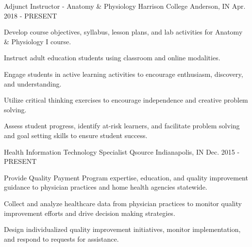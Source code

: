 

\begin{cventries}

  \cventry
    {Adjunct Instructor - Anatomy \& Physiology}
    {Harrison College}
    {Anderson, IN}
    {Apr. 2018 - PRESENT}
    {
      \begin{cvitems}
      \item {Develop course objectives, syllabus, lesson plans, and lab activities for Anatomy \& Physiology I course.} 
      \item {Instruct adult education students using classroom and online modalities.}
        \item {Engage students in active learning activities to encourage enthusiasm, discovery, and understanding.}
        \item {Utilize critical thinking exercises to encourage independence and creative problem solving.}
      \item {Assess student progress, identify at-risk learners, and facilitate problem solving and goal setting skills to ensure student success.}
        \end{cvitems}
    }

  \cventry
    {Health Information Technology Specialist} %
    {Qsource} %
    {Indianapolis, IN} %
    {Dec. 2015 - PRESENT} %
    {
      \begin{cvitems} %
      \item {Provide Quality Payment Program expertise, education, and quality improvement guidance to physician practices and home health agencies statewide. }
      \item {Collect and analyze healthcare data from physician practices to monitor quality improvement efforts and drive decision making strategies.}
        \item {}
        \item {Design individualized quality improvement initiatives, monitor implementation, and respond to requests for assistance.}
      \end{cvitems}
    }


\end{cventries}
